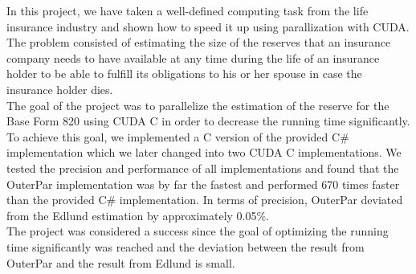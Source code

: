 In this project, we have taken a well-defined computing task from the life insurance industry and shown how to speed it up using parallization with CUDA. The problem consisted of estimating the size of the reserves that an insurance company needs to have available at any time during the life of an insurance holder to be able to fulfill its obligations to his or her spouse in case the insurance holder dies.\\

The goal of the project was to parallelize the estimation of the reserve for the Base Form 820 using CUDA C in order to decrease the running time significantly. To achieve this goal, we implemented a C version of the provided C\# implementation which we later changed into two CUDA C implementations. We tested the precision and performance of all implementations and found that the OuterPar implementation was by far the fastest and performed 670 times faster than the provided C\# implementation. In terms of precision, OuterPar deviated from the Edlund estimation by approximately 0.05\%.\\

The project was considered a success since the goal of optimizing the running time significantly was reached and the deviation between the result from OuterPar and the result from Edlund is small.